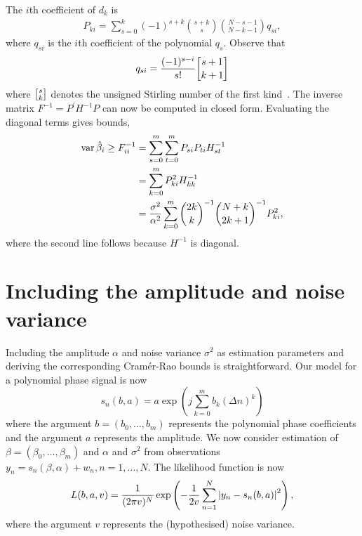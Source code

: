 \documentclass[review]{elsarticle}
\begin{document}
The $i$th coefficient of $d_k$ is
\begin{align*}
P_{ki} = \sum_{s=0}^k{(-1)^{s+k}\binom{s+k}{s}\binom{N-s-1}{N-k-1}q_{si}},
\end{align*}
where $q_{si}$ is the $i$th coefficient of the polynomial $q_s$.  Observe that
\[
q_{si} = \frac{(-1)^{s-i}}{s!}\stirling{s+1}{k+1}
\]
where $\stirling{s}{k}$ denotes the unsigned Stirling number of the first kind~\cite{Abramowitz_Stegen_stirling_numbers_1972}.  
The inverse matrix $F^{-1} = P^\prime H^{-1} P$ can now be computed in closed form.  Evaluating the diagonal terms gives bounds,
\begin{align*}
\operatorname{var} \hat{\beta}_i \geq F_{ii}^{-1} &=  \sum_{s=0}^{m}\sum_{t=0}^{m} P_{si} P_{ti}  H_{st}^{-1} \\
&=  \sum_{k=0}^{m} P_{ki}^2  H_{kk}^{-1} \\
&= \frac{\sigma^2}{\alpha^2} \sum_{k=0}^{m} \binom{2k}{k}^{-1} \binom{N+k}{2k+1}^{-1} P_{ki}^2,
\end{align*}
where the second line follows because $H^{-1}$ is diagonal.
 

\section{Including the amplitude and noise variance}\label{sec:including-amplitude}

Including the amplitude $\alpha$ and noise variance $\sigma^2$ as estimation parameters and deriving the corresponding Cram\'{e}r-Rao bounds is straightforward.  Our model for a polynomial phase signal is now
\[
s_n(b,a) = a \exp\left( j \sum_{k = 0}^{m}{b_k (\Delta n)^k}\right)
\]
where the argument $b=(b_0, \dots, b_m)$ represents the polynomial phase coefficients and the argument $a$ represents the amplitude.  We now consider estimation of $\beta = (\beta_0, \dots, \beta_m)$ and $\alpha$ and $\sigma^2$  from observations $y_n = s_n(\beta,\alpha) + w_n, n = 1,\dots,N$.  The likelihood function is now
\[
L(b,a,v) = \frac{1}{(2 \pi v )^N} \exp\left( - \frac{1}{2 v } \sum_{n=1}^N {\left| y_n -  s_n(b,a)  \right|}^2 \right),
\]
where the argument $v$ represents the (hypothesised) noise variance.
\end{document}
